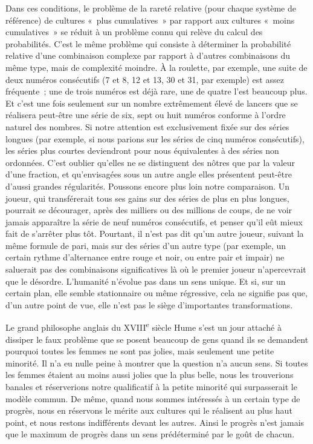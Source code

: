 \documentclass[french,twoside]{book} %
\begin{document}
Dans ces conditions, le problème de la rareté relative (pour chaque système de référence) de cultures « plus cumulatives » par rapport aux cultures « moins cumulatives » se réduit à un problème connu qui relève du calcul des probabilités. C’est le même problème qui consiste à déterminer la probabilité relative d’une combinaison complexe par rapport à d’autres combinaisons du même type, mais de complexité moindre. À la roulette, par exemple, une suite de deux numéros consécutifs (7 et 8, 12 et 13, 30 et 31, par exemple) est assez fréquente ; une de trois numéros est déjà rare, une de quatre l’est beaucoup plus. Et c’est une fois seulement sur un nombre extrêmement élevé de lancers que se réalisera peut-être une série de six, sept ou huit numéros conforme à l’ordre naturel des nombres. Si notre attention est exclusivement fixée sur des séries longues (par exemple, si nous parions sur les séries de cinq numéros consécutifs), les séries plus courtes deviendront pour nous équivalentes à des séries non ordonnées. C’est oublier qu’elles ne se distinguent des nôtres que par la valeur d’une fraction, et qu’envisagées sous un autre angle elles présentent peut-être d’aussi grandes régularités. Poussons encore plus loin notre comparaison. Un joueur, qui transférerait tous ses gains sur des séries de plus en plus longues, pourrait se décourager, après des milliers ou des millions de coups, de ne voir jamais apparaître la série de neuf numéros consécutifs, et penser qu’il eût mieux fait de s’arrêter plus tôt. Pourtant, il n’est pas dit qu’un autre joueur, suivant la même formule de pari, mais sur des séries d’un autre type (par exemple, un certain rythme d’alternance entre rouge et noir, ou entre pair et impair) ne saluerait pas des combinaisons significatives là où le premier joueur n’apercevrait que le désordre. L’humanité n’évolue pas dans un sens unique. Et si, sur un certain plan, elle semble stationnaire ou même régressive, cela ne signifie pas que, d’un autre point de vue, elle n’est pas le siège d’importantes transformations.\par
Le grand philosophe anglais du XVIII\textsuperscript{e} siècle Hume s’est un jour attaché à dissiper le faux problème que se posent beaucoup de gens quand ils se demandent pourquoi toutes les femmes ne sont pas jolies, mais seulement une petite minorité. Il n’a eu nulle peine à montrer que la question n’a aucun sens. Si toutes les femmes étaient au moins aussi jolies que la plus belle, nous les trouverions banales et réserverions notre qualificatif à la petite minorité qui surpasserait le modèle commun. De même, quand nous sommes intéressés à un certain type de progrès, nous en réservons le mérite aux cultures qui le réalisent au plus haut point, et nous restons indifférents devant les autres. Ainsi le progrès n’est jamais que le maximum de progrès dans un sens prédéterminé par le goût de chacun.
\end{document}
